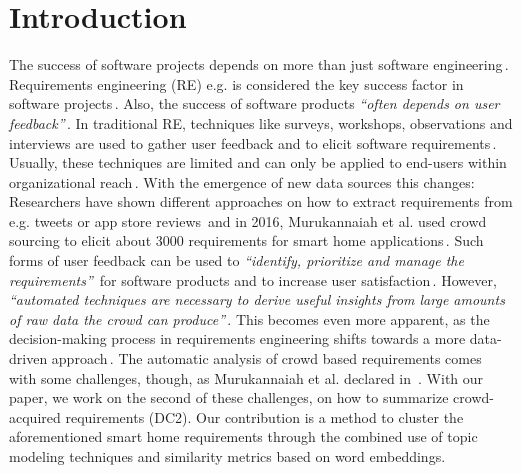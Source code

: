 \section{Introduction} %
\label{sec:introduction}
The success of software projects depends on more than just software engineering\,\cite{mohagheghi_what_2017}. Requirements engineering (RE) e.g. is considered the key success factor in software projects\,\cite{mavin_towards_2019}. Also, the success of software products \textit{``often  depends  on  user  feedback''}\,\cite{maalej_toward_2016}. In traditional RE, techniques like surveys, workshops, observations and interviews are used to gather user feedback and to elicit software requirements\,\cite{pohl_requirements_2015}. Usually, these techniques are limited and can only be applied to end-users within organizational reach\,\cite{oriol_fame_2018}. With the emergence of new data sources this changes: Researchers have shown different approaches on how to extract requirements from e.g. tweets or app store reviews\,\cite{oriol_fame_2018,stanik_classifying_2019} and in 2016, Murukannaiah et al. used crowd sourcing to elicit about 3000 requirements for smart home applications\,\cite{murukannaiah_acquiring_2016}. Such forms of user feedback can be used to \textit{``identify, prioritize and manage the requirements''}\,\cite{maalej_toward_2016} for software products and to increase user satisfaction\,\cite{palomba_user_2015}. However, \textit{``automated techniques are necessary to derive useful insights from large amounts of raw data the crowd can produce''}\,\cite{murukannaiah_toward_2017}. This becomes even more apparent, as the decision-making process in requirements engineering shifts towards a more data-driven approach\,\cite{maalej_data-driven_2019}. The automatic analysis of crowd based requirements comes with some challenges, though, as Murukannaiah et al. declared in \,\cite{murukannaiah_toward_2017}. With our paper, we work on the second of these challenges, on how to summarize crowd-acquired requirements (DC2). Our contribution is a method to cluster the aforementioned smart home requirements through the combined use of topic modeling techniques and similarity metrics based on word embeddings.
